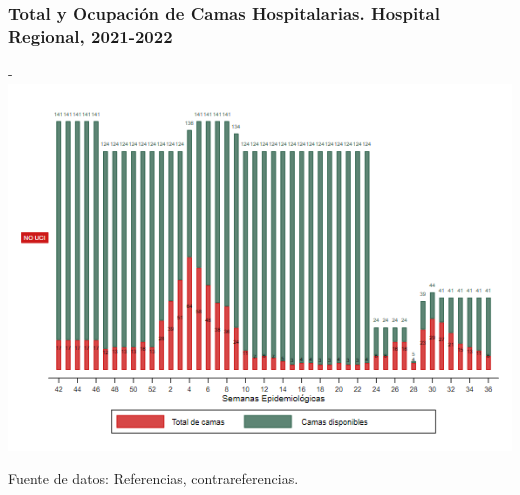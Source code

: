 \documentclass[xcolor=table]{beamer}
\begin{document}
	\begin{frame}
		\frametitle{Total y Ocupación de Camas Hospitalarias. Hospital Regional, 2021-2022}
		\vspace{-.2cm}
		\begin{center}
	-		\includegraphics[width=0.8\linewidth, trim={0cm .5cm 0cm 0.2cm},clip]{../figuras/h_regional_nouci.png}
			
			\begin{table}[]
			\end{table}
			
		\end{center}
		{\tiny Fuente de datos: Referencias, contrareferencias.}
 	\end{frame}
	
\end{document}
